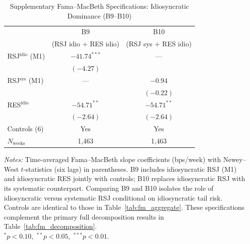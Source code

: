 \documentclass[11pt,a4paper]{article}
\begin{document}
\begin{table}[!htbp]
\centering
\caption{Supplementary Fama--MacBeth Specifications: Idiosyncratic Dominance (B9--B10)}
\label{tab:fm_supplementary}
\small
\begin{threeparttable}
\begin{tabular}{l c c}
\toprule
 & B9 & B10 \\
 & (RSJ idio $+$ RES idio) & (RSJ sys $+$ RES idio) \\
\midrule
RSJ$^{\text{idio}}$ (M1)
  & $-41.74^{***}$ & ---            \\
  & $(-4.27)$      &                \\[3pt]
RSJ$^{\text{sys}}$ (M1)
  & ---            & $-0.94$        \\
  &                & $(-0.22)$      \\[3pt]
RES$^{\text{idio}}$
  & $-54.71^{**}$  & $-54.71^{**}$  \\
  & $(-2.64)$      & $(-2.64)$      \\[5pt]
Controls (6)        & Yes & Yes \\
$N_{\text{weeks}}$  & 1{,}463 & 1{,}463 \\
\bottomrule
\end{tabular}
\begin{tablenotes}
\footnotesize
\item \textit{Notes:} Time-averaged Fama--MacBeth slope coefficients (bps/week) with
Newey--West $t$-statistics (six lags) in parentheses. B9 includes idiosyncratic RSJ
(M1) and idiosyncratic RES jointly with controls; B10 replaces idiosyncratic RSJ with
its systematic counterpart. Comparing B9 and B10 isolates the role of idiosyncratic
versus systematic RSJ conditional on idiosyncratic tail risk. Controls are identical to
those in Table~\ref{tab:fm_aggregate}. These specifications complement the primary full
decomposition results in Table~\ref{tab:fm_decomposition}. \\
$^{*}p<0.10$,\ $^{**}p<0.05$,\ $^{***}p<0.01$.
\end{tablenotes}
\end{threeparttable}
\end{table}
\end{document}

